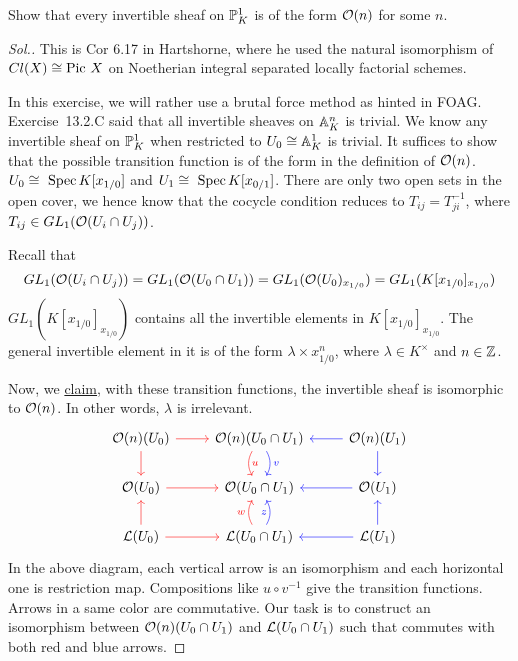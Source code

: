 \documentclass[11pt]{book} %
\begin{document}
\begin{exr}
Show that every invertible sheaf on $\mathbb P^1_K$ is of the form ${\cal O}(n)$ for some $n$.
\end{exr}
\begin{proof}[Sol.]
This is Cor 6.17 in Hartshorne, where he used the natural isomorphism of $Cl(X)\cong \text{Pic\ } X$ on Noetherian integral separated locally factorial schemes. 

In this exercise, we will rather use a brutal force method as hinted in FOAG.
Exercise~13.2.C said that all invertible sheaves on $\mathbb A^n_K$ is trivial. We know any invertible sheaf on $\mathbb P^1_K$ when restricted to $U_0\cong \mathbb A^1_K$ is trivial. It suffices to show that the possible transition function is of the form in the definition of ${\cal O}(n)$.
$U_0\cong \text{ Spec\,} K[x_{1/0}]$ and $U_1\cong\text{ Spec\,} K[x_{0/1}]$. There are only two open sets in the open cover, we hence know that the cocycle condition reduces to
$T_{ij}=T_{ji}^{-1}$, where $T_{ij}\in GL_1({\cal O}(U_i\cap U_j))$.

Recall that 
$$
GL_1({\cal O}(U_i\cap U_j))=GL_1({\cal O}(U_0\cap U_1))=GL_1({\cal O}(U_0)_{x_{1/0}})=GL_1(K[x_{1/0}]_{x_{1/0}})
$$
$GL_1(K[x_{1/0}]_{x_{1/0}})$ contains all the invertible elements in $K[x_{1/0}]_{x_{1/0}}$. The general invertible element in it is of the form
$\lambda\times x_{1/0}^n$, where $\lambda\in K^\times$ and $n\in \mathbb Z$.

Now, we \underline{claim}, with these transition functions, the invertible sheaf is isomorphic to ${\cal O}(n)$. In other words, $\lambda$ is irrelevant. 
$$
\begin{tikzcd}
\calo(n)(U_0) \arrow[d,red] \arrow[r,red] & \calo(n)(U_0\cap U_1) \arrow[d, bend left,blue,"v"] \arrow[d, bend right, red,"u"] & \calo(n)(U_1) \arrow[d,blue] \arrow[l,blue] \\
\calo(U_0) \arrow[r,red] & \calo(U_0\cap U_1) & \calo(U_1) \arrow[l,blue] \\
\call(U_0) \arrow[u,red] \arrow[r,red] & \call(U_0\cap U_1) \arrow[u, bend left,red,"w"] \arrow[u, bend right,blue,"z"] & \call(U_1) \arrow[u,blue] \arrow[l,blue]
\end{tikzcd}
$$
In the above diagram, each vertical arrow is an isomorphism and each horizontal one is restriction map. Compositions like $u\circ v^{-1} $ give the transition functions. Arrows in a same color are commutative. Our task is to construct an isomorphism between ${\cal O}(n)(U_0\cap U_1)$ and ${\cal L}(U_0\cap U_1)$ such that commutes with both red and blue arrows.
\end{proof}
\end{document}
